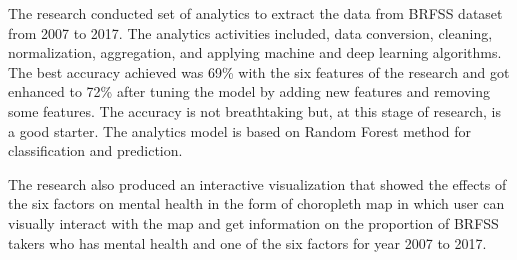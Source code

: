 \documentclass[letterpaper, 10 pt, conference]{ieeeconf}  %
\begin{document}
The research conducted set of analytics to extract the data from BRFSS dataset from 2007 to 2017. The analytics activities included, data conversion, 
cleaning, normalization, aggregation, and applying machine and deep learning algorithms. The best accuracy achieved was 69\% with the 
six features of the research and got enhanced to 72\% after tuning the model by adding new features and removing some features.
The accuracy is not breathtaking but, at this stage of research, is a good starter. The analytics model is based on Random Forest method
for classification and prediction.

The research also produced an interactive visualization that showed the effects of the six factors on mental health in the form of choropleth map
in which user can visually interact with the map and get information on the proportion of BRFSS takers who has mental health and one of the 
six factors for year 2007 to 2017. 

\captionsetup[figure]{labelformat=empty}
\clearpage 
\begin{figure}[hbt!]
        \centering
        
        \addvspace{250pt}
        
        \hspace{-10cm}
        
        \caption{}
        \label{fig:project-features}
\end{figure}
\clearpage 

\captionsetup[figure]{labelformat=empty}
\clearpage 
\begin{figure}[hbt!]
        \centering
        
        \addvspace{250pt}
        
        \hspace{-10cm}
        
        \caption{}
        \label{fig:map}
\end{figure}
\clearpage 

\captionsetup[figure]{labelformat=empty}
\clearpage 
\begin{figure}[hbt!]
        \centering
        
        \addvspace{250pt}
        
        \hspace{-10cm}
        
        \caption{}
        \label{fig:schedule}
\end{figure}
\end{document}
